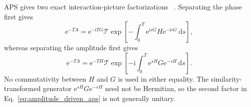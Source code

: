 \documentclass[aps,pra,reprint,floatfix,unsortedaddress,superscriptaddress]{revtex4-2}
\begin{document}
APS gives two exact interaction-picture factorizations
~\cite{hu2026quantumsimulationnonunitarydynamics}.  Separating the phase
first gives
\begin{equation}
    \mathrm e^{-TA}
    =
    \mathrm e^{-\mathrm iTG}
    \mathcal T
    \exp\!\left[
        -\int_0^T
        \mathrm e^{\mathrm isG}H
        \mathrm e^{-\mathrm isG}\,\mathrm ds
    \right],
    \label{eq:phase_driven_aps}
\end{equation}
whereas separating the amplitude first gives
\begin{equation}
    \mathrm e^{-TA}
    =
    \mathrm e^{-T H}
    \mathcal T
    \exp\!\left[
        -\mathrm i\int_0^T
        \mathrm e^{sH}G
        \mathrm e^{-sH}\,\mathrm ds
    \right].
    \label{eq:amplitude_driven_aps}
\end{equation}
No commutativity between $H$ and $G$ is used in either equality.  The
similarity-transformed generator
$\mathrm e^{sH}G\mathrm e^{-sH}$ need not be Hermitian, so the second
factor in Eq.~\eqref{eq:amplitude_driven_aps} is not generally unitary.
\end{document}
